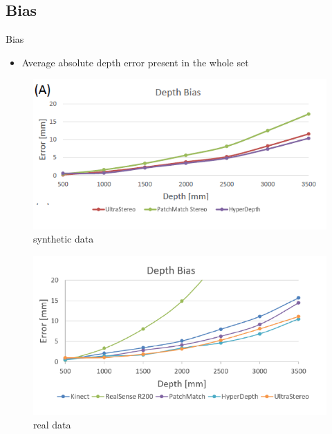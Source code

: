 \subsection{Bias}
\begin{frame}{Bias}
\begin{itemize}
\item Average absolute depth error present in the whole set
\end{itemize}
\begin{figure}
\includegraphics[scale=0.25]{pictures/fig3_depth_Bias_synthetic_data}
\caption{synthetic data}
\end{figure}
\begin{figure}
\includegraphics[scale=0.25]{pictures/fig_4_depth_bias_real_data}
\caption{real data}
\end{figure}
\end{frame}

